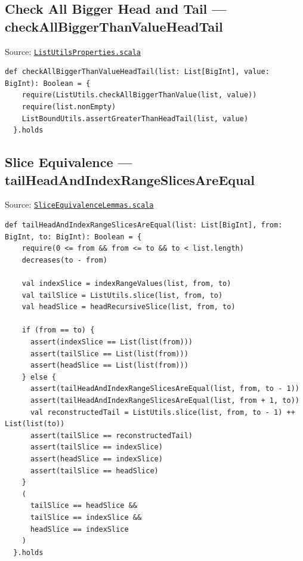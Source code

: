 \subsection{Check All Bigger Head and Tail --- checkAllBiggerThanValueHeadTail}

Source:
\href{https://github.com/thiagomata/prime-numbers/blob/list-article-v1.0.0/src/main/scala/v1/chapter3/list/properties/ListUtilsProperties.scala}{\texttt{ListUtilsProperties.scala}}

\begin{lstlisting}[style=scala]
  def checkAllBiggerThanValueHeadTail(list: List[BigInt], value: BigInt): Boolean = {
    require(ListUtils.checkAllBiggerThanValue(list, value))
    require(list.nonEmpty)
    ListBoundUtils.assertGreaterThanHeadTail(list, value)
  }.holds
\end{lstlisting}

\subsection{Slice Equivalence --- tailHeadAndIndexRangeSlicesAreEqual}

Source:
\href{https://github.com/thiagomata/prime-numbers/blob/list-article-v1.0.0/src/main/scala/v1/chapter3/list/properties/SliceEquivalenceLemmas.scala}{\texttt{SliceEquivalenceLemmas.scala}}

\begin{lstlisting}[style=scala]
  def tailHeadAndIndexRangeSlicesAreEqual(list: List[BigInt], from: BigInt, to: BigInt): Boolean = {
    require(0 <= from && from <= to && to < list.length)
    decreases(to - from)

    val indexSlice = indexRangeValues(list, from, to)
    val tailSlice = ListUtils.slice(list, from, to)
    val headSlice = headRecursiveSlice(list, from, to)

    if (from == to) {
      assert(indexSlice == List(list(from)))
      assert(tailSlice == List(list(from)))
      assert(headSlice == List(list(from)))
    } else {
      assert(tailHeadAndIndexRangeSlicesAreEqual(list, from, to - 1))
      assert(tailHeadAndIndexRangeSlicesAreEqual(list, from + 1, to))
      val reconstructedTail = ListUtils.slice(list, from, to - 1) ++ List(list(to))
      assert(tailSlice == reconstructedTail)
      assert(tailSlice == indexSlice)
      assert(headSlice == indexSlice)
      assert(tailSlice == headSlice)
    }
    (
      tailSlice == headSlice &&
      tailSlice == indexSlice &&
      headSlice == indexSlice
    )
  }.holds
\end{lstlisting}

